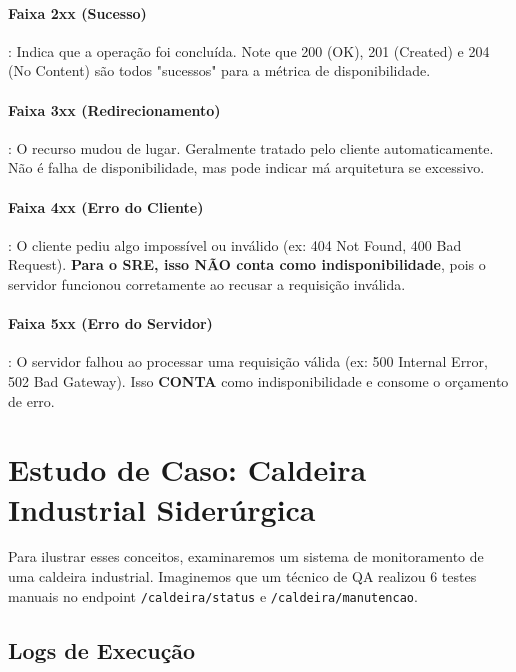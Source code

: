 \documentclass[12pt,a4paper,twoside]{report}
\begin{document}
\paragraph{Faixa 2xx (Sucesso)}: Indica que a operação foi concluída. Note que 200 (OK), 201 (Created) e 204 (No Content) são todos "sucessos" para a métrica de disponibilidade.

\paragraph{Faixa 3xx (Redirecionamento)}: O recurso mudou de lugar. Geralmente tratado pelo cliente automaticamente. Não é falha de disponibilidade, mas pode indicar má arquitetura se excessivo.

\paragraph{Faixa 4xx (Erro do Cliente)}: O cliente pediu algo impossível ou inválido (ex: 404 Not Found, 400 Bad Request). \textbf{Para o SRE, isso NÃO conta como indisponibilidade}, pois o servidor funcionou corretamente ao recusar a requisição inválida.

\paragraph{Faixa 5xx (Erro do Servidor)}: O servidor falhou ao processar uma requisição válida (ex: 500 Internal Error, 502 Bad Gateway). Isso \textbf{CONTA} como indisponibilidade e consome o orçamento de erro.

\section{Estudo de Caso: Caldeira Industrial Siderúrgica}

Para ilustrar esses conceitos, examinaremos um sistema de monitoramento de uma caldeira industrial. Imaginemos que um técnico de QA realizou 6 testes manuais no endpoint \texttt{/caldeira/status} e \texttt{/caldeira/manutencao}.

\subsection{Logs de Execução}
\end{document}
